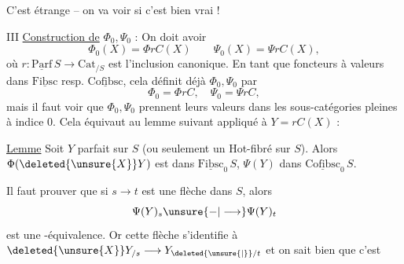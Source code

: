 C'est  étrange -- on va voir si c'est bien vrai !

III \uline{Construction de} $\Phi_0,\Psi_0$ :
On doit avoir
\[
\Phi_0(X)=\Phi r C(X)\qquad \Psi_0(X)=\Psi r C(X),
\]
où   $r:\underline{\mathrm{Parf}}\,S\longrightarrow\mathrm{Cat}_{/S}$ est l'inclusion canonique. En tant que foncteurs à valeurs dans $\underline{\mathrm{Fibsc}}$ resp. $\underline{\mathrm{Cofibsc}}$, cela définit déjà $\Phi_0,\Psi_0$ par
\[
\Phi_0=\Phi r C,\quad \Psi_0=\Psi r C,
\]
mais il faut voir que $\Phi_0,\Psi_0$ prennent leurs valeurs dans les sous-catégories pleines à indice $0$.  Cela équivaut  au lemme suivant \unsure{,|;} appliqué à $Y=rC(X)$ :

\uline{Lemme} Soit $Y$ parfait sur $S$ (ou seulement un Hot-fibré sur $S$). Alors $\Phi(\deleted{\unsure{X}}Y)$ est dans $\underline{\mathrm{Fibsc}}_0\,S$, $\Psi(Y)$ dans $\underline{\mathrm{Cofibsc}}_0\,S$.

Il faut prouver  que si  $s\longrightarrow t$ est une flèche dans $S$, alors
\[
\Psi(Y)_s\unsure{\mathord{-}|\longrightarrow}\Psi(Y)_t
\]
est une -équivalence. Or cette flèche s'identifie à $\deleted{\unsure{X}}Y_{/s}\longrightarrow Y_{\deleted{\unsure{\vert}}/t}$ et on sait bien que c'est  %
